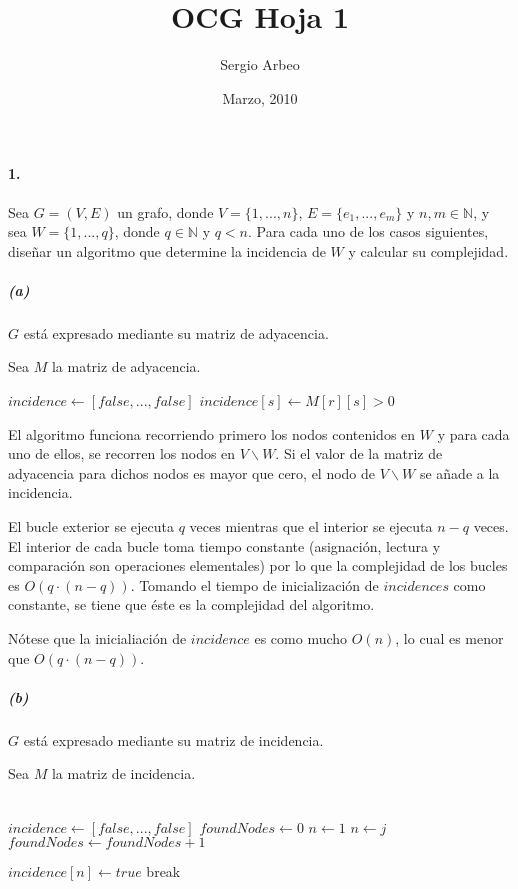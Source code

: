 \documentclass[12pt, oneside, a4paper]{article}
\begin{document}
\title{OCG Hoja 1}\author{Sergio Arbeo}\date{Marzo, 2010}\maketitle
\paragraph{1.}\label{ssub:1_} %
Sea $G=(V,E)$ un grafo, donde $V=\{1,...,n\}$, $E=\{e_{1},...,e_{m}\}$
y $n,m\in\mathbb{N}$, y sea $W=\{1,...,q\}$, donde $q\in\mathbb{N}$ y
$q<n$. Para cada uno de los casos siguientes, dise\~nar un algoritmo que
determine la incidencia de $W$ y calcular su complejidad.


\subparagraph{(a)} $G$ está expresado mediante su matriz de adyacencia.

Sea $M$ la matriz de adyacencia.

\begin{algorithmic}[1]
\STATE $incidence \gets [false,...,false]$
    \STATE $incidence[s] \gets M[r][s] > 0$
  \ENDFOR
\ENDFOR
\end{algorithmic}

El algoritmo funciona recorriendo primero los nodos contenidos en $W$
y para cada uno de ellos, se recorren los nodos en $V\backslash W$. Si
el valor de la matriz de adyacencia para dichos nodos es mayor que
cero, el nodo de $V\backslash W$ se añade a la incidencia.

El bucle exterior se ejecuta $q$ veces mientras que el interior se
ejecuta $n-q$ veces. El interior de cada bucle toma tiempo constante
(asignación, lectura y comparación son operaciones elementales) por lo
que la complejidad de los bucles es $O(q\cdot (n-q))$. Tomando el
tiempo de inicialización de $incidences$ como constante, se tiene que
éste es la complejidad del algoritmo.

Nótese que la inicialiación de $incidence$ es como mucho $O(n)$, lo cual
es menor que $O(q\cdot (n-q))$.

\subparagraph{(b)} $G$ está expresado mediante su matriz de
incidencia.

Sea $M$ la matriz de incidencia.\\\\

\begin{algorithmic}[1]
\STATE $incidence \gets  [false,...,false]$
  \STATE $foundNodes \gets 0$
  \STATE $n \gets 1$
      \STATE $n \gets j$
      \STATE $foundNodes \gets foundNodes + 1$
    \ENDIF
  \ENDFOR
  
        \STATE $incidence[n] \gets true$
        \STATE break
      \ENDIF
    \ENDFOR
   \ENDIF
\ENDFOR
\end{algorithmic}
\end{document}
